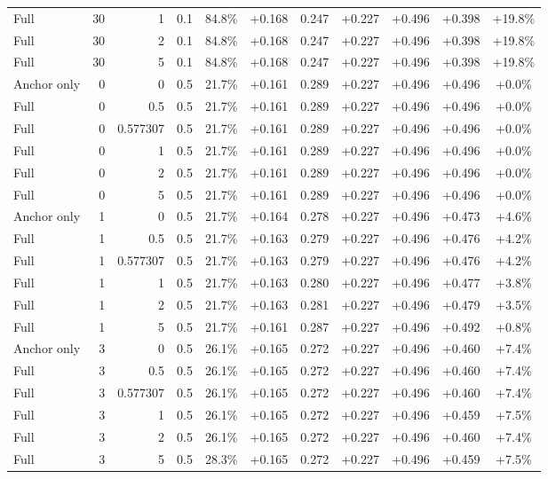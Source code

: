 \begin{table}[htbp]
\begin{tabular}{lrrrccccccc}
Full & 30 & 1 & 0.1 & 84.8\% & +0.168 & 0.247 & +0.227 & +0.496 & +0.398 & +19.8\% \\
Full & 30 & 2 & 0.1 & 84.8\% & +0.168 & 0.247 & +0.227 & +0.496 & +0.398 & +19.8\% \\
Full & 30 & 5 & 0.1 & 84.8\% & +0.168 & 0.247 & +0.227 & +0.496 & +0.398 & +19.8\% \\
Anchor only & 0 & 0 & 0.5 & 21.7\% & +0.161 & 0.289 & +0.227 & +0.496 & +0.496 & +0.0\% \\
Full & 0 & 0.5 & 0.5 & 21.7\% & +0.161 & 0.289 & +0.227 & +0.496 & +0.496 & +0.0\% \\
Full & 0 & 0.577307 & 0.5 & 21.7\% & +0.161 & 0.289 & +0.227 & +0.496 & +0.496 & +0.0\% \\
Full & 0 & 1 & 0.5 & 21.7\% & +0.161 & 0.289 & +0.227 & +0.496 & +0.496 & +0.0\% \\
Full & 0 & 2 & 0.5 & 21.7\% & +0.161 & 0.289 & +0.227 & +0.496 & +0.496 & +0.0\% \\
Full & 0 & 5 & 0.5 & 21.7\% & +0.161 & 0.289 & +0.227 & +0.496 & +0.496 & +0.0\% \\
Anchor only & 1 & 0 & 0.5 & 21.7\% & +0.164 & 0.278 & +0.227 & +0.496 & +0.473 & +4.6\% \\
Full & 1 & 0.5 & 0.5 & 21.7\% & +0.163 & 0.279 & +0.227 & +0.496 & +0.476 & +4.2\% \\
Full & 1 & 0.577307 & 0.5 & 21.7\% & +0.163 & 0.279 & +0.227 & +0.496 & +0.476 & +4.2\% \\
Full & 1 & 1 & 0.5 & 21.7\% & +0.163 & 0.280 & +0.227 & +0.496 & +0.477 & +3.8\% \\
Full & 1 & 2 & 0.5 & 21.7\% & +0.163 & 0.281 & +0.227 & +0.496 & +0.479 & +3.5\% \\
Full & 1 & 5 & 0.5 & 21.7\% & +0.161 & 0.287 & +0.227 & +0.496 & +0.492 & +0.8\% \\
Anchor only & 3 & 0 & 0.5 & 26.1\% & +0.165 & 0.272 & +0.227 & +0.496 & +0.460 & +7.4\% \\
Full & 3 & 0.5 & 0.5 & 26.1\% & +0.165 & 0.272 & +0.227 & +0.496 & +0.460 & +7.4\% \\
Full & 3 & 0.577307 & 0.5 & 26.1\% & +0.165 & 0.272 & +0.227 & +0.496 & +0.460 & +7.4\% \\
Full & 3 & 1 & 0.5 & 26.1\% & +0.165 & 0.272 & +0.227 & +0.496 & +0.459 & +7.5\% \\
Full & 3 & 2 & 0.5 & 26.1\% & +0.165 & 0.272 & +0.227 & +0.496 & +0.460 & +7.4\% \\
Full & 3 & 5 & 0.5 & 28.3\% & +0.165 & 0.272 & +0.227 & +0.496 & +0.459 & +7.5\% \\

\end{tabular}
\end{table}
